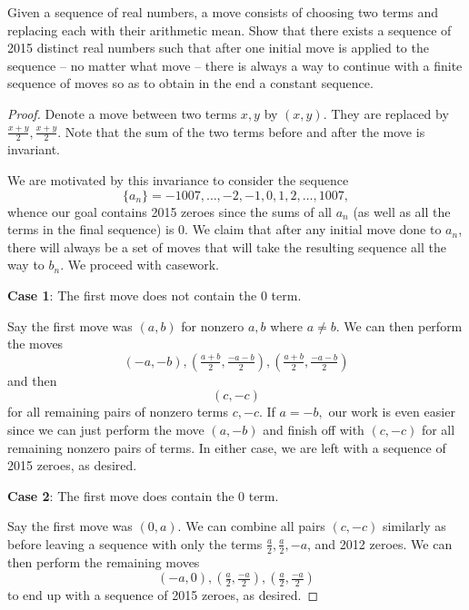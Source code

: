 \documentclass[letterpaper,oneside]{scrartcl}
\begin{document}
\begin{problem*}
  [USAJMO 2015/1]
  Given a sequence of real numbers, a move consists of choosing two terms and replacing each with their arithmetic mean. Show that there exists a sequence of 2015 distinct real numbers such that after one initial move is applied to the sequence -- no matter what move -- there is always a way to continue with a finite sequence of moves so as to obtain in the end a constant sequence.
\end{problem*}
\begin{proof}
  Denote a move between two terms \(x,y\) by \((x,y)\). They are replaced by \(\frac{x+y}{2},\frac{x+y}{2}\). Note that the sum of the two terms before and after the move is invariant. 

  We are motivated by this invariance to consider the sequence
  \[\{a_n\} = -1007,\dots,-2,-1,0,1,2,\dots,1007,\]
  whence our goal contains 2015 zeroes
  since the sums of all \(a_n\) (as well as all the terms in the final sequence) is 0. 
  We claim that after any initial move done to \(a_n\), 
  there will always be a set of moves that will take 
  the resulting sequence all the way to \(b_n\). 
  We proceed with casework.

  \textbf{Case 1}: The first move does not contain the 0 term.

  Say the first move was \((a,b)\) for nonzero \(a,b\) where \(a \neq b\). We can then perform the moves 
  \[(-a,-b), (\tfrac{a+b}{2},\tfrac{-a-b}{2}), (\tfrac{a+b}{2},\tfrac{-a-b}{2})\] and then \[(c,-c)\]
  for all remaining pairs of nonzero terms \(c,-c\). 
  If \(a=-b,\) our work is even easier since we can
  just perform the move \((a,-b)\) and finish off with \((c,-c)\) for all remaining nonzero pairs of terms. In either case, we are left with a sequence of 2015 zeroes, as desired.

  \textbf{Case 2}: The first move does contain the 0 term.

  Say the first move was \((0,a)\). We can combine all pairs \((c,-c)\) similarly as before leaving a sequence with only the terms \(\tfrac{a}{2}, \tfrac{a}{2}, -a\), and 2012 zeroes. 
  We can then perform the remaining moves
  \[(-a,0),(\tfrac{a}{2},\tfrac{-a}{2}),(\tfrac{a}{2},\tfrac{-a}{2})\]
  to end up with a sequence of 2015 zeroes, as desired.
\end{proof}
\end{document}
